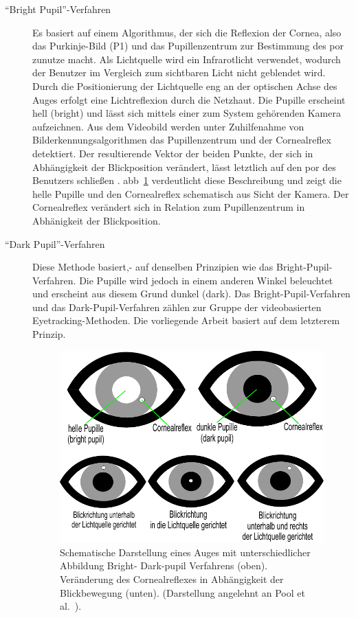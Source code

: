 \begin{description}
\item[\enquote{Bright Pupil}-Verfahren] Es basiert auf einem Algorithmus, der sich die Reflexion der Cornea, also das Purkinje-Bild (P1) und das Pupillenzentrum zur Bestimmung des \acs{por} zunutze macht. Als Lichtquelle wird ein Infrarotlicht verwendet, wodurch der Benutzer im Vergleich zum sichtbaren Licht nicht geblendet wird. Durch die Positionierung der Lichtquelle eng an der optischen Achse des Auges erfolgt eine Lichtreflexion durch die Netzhaut. Die Pupille erscheint hell (bright) und lässt sich mittels einer zum System gehörenden Kamera aufzeichnen. Aus dem Videobild werden unter Zuhilfenahme von Bilderkennungsalgorithmen das Pupillenzentrum und der Cornealreflex detektiert. Der resultierende Vektor der beiden Punkte, der sich in Abhängigkeit der Blickposition verändert, lässt letztlich auf den \acs{por} des Benutzers schließen \cite{Poole2005}. \acl{abb}~\ref{fig:schemaPurk} verdeutlicht diese Beschreibung und zeigt die helle Pupille und den Cornealreflex schematisch aus Sicht der Kamera. Der Cornealreflex verändert sich in Relation zum Pupillenzentrum in Abhänigkeit der Blickposition.
\item[\enquote{Dark Pupil}-Verfahren] Diese Methode basiert,- auf denselben Prinzipien wie das Bright-Pupil-Verfahren. Die Pupille wird jedoch in einem anderen Winkel beleuchtet und erscheint aus diesem Grund dunkel (dark). Das Bright-Pupil-Verfahren und das Dark-Pupil-Verfahren zählen zur Gruppe der videobasierten Eyetracking-Methoden. Die vorliegende Arbeit basiert auf dem letzterem Prinzip.

\begin{figure}[ht]
\begin{minipage}[t]{\linewidth} 
      \centering 
      \includegraphics[scale=0.7]{bilder/grundlagen/eye22.pdf}
  \caption{Schematische Darstellung eines Auges mit unterschiedlicher Abbildung Bright- \bzw Dark-pupil Verfahrens (oben). Veränderung des Cornealreflexes in Abhängigkeit der Blickbewegung (unten). (Darstellung angelehnt an Pool et al.~\cite{Poole2005}).}\label{fig:schemaPurk} 
   \end{minipage}%
\end{figure}
\end{description}

